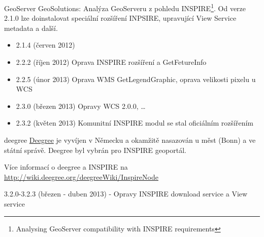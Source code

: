 \documentclass{beamer}
\begin{document}
\begin{frame}{GeoServer}
    GeoSolutions: Analýza GeoServeru z pohledu
    INSPIRE\footnote{{Analysing GeoServer compatibility with INSPIRE requirements}}.
Od verze 2.1.0 lze doinstalovat speciální rozšíření INPSIRE, upravující View
Service metadata a další.
    \begin{itemize}
        \item 2.1.4 (červen 2012)
            \pause
        \item 2.2.2 (říjen 2012) Oprava INSPIRE rozšíření a GetFetureInfo
            \pause
        \item 2.2.5 (únor 2013) Oprava WMS GetLegendGraphic, oprava velikosti
        pixelu u WCS
            \pause
        \item 2.3.0 (březen 2013) Opravy WCS 2.0.0, \dots
            \pause
        \item 2.3.2 (květen 2013) Komunitní INSPIRE modul se stal oficiálním
            rozšířením
    \end{itemize}
\end{frame}


\begin{frame}{deegree}
\href{http://deegree.org}{Deegree} je vyvíjen v Německu a okamžitě nasazován u měst (Bonn) a ve státní
správě. Deegree byl vybrán pro INSPIRE geoportál.

Více informací o deegree a INSPIRE na
\url{http://wiki.deegree.org/deegreeWiki/InspireNode}

3.2.0-3.2.3 (březen - duben 2013) - Opravy INSPIRE download service a View service
\end{frame}
\end{document}

